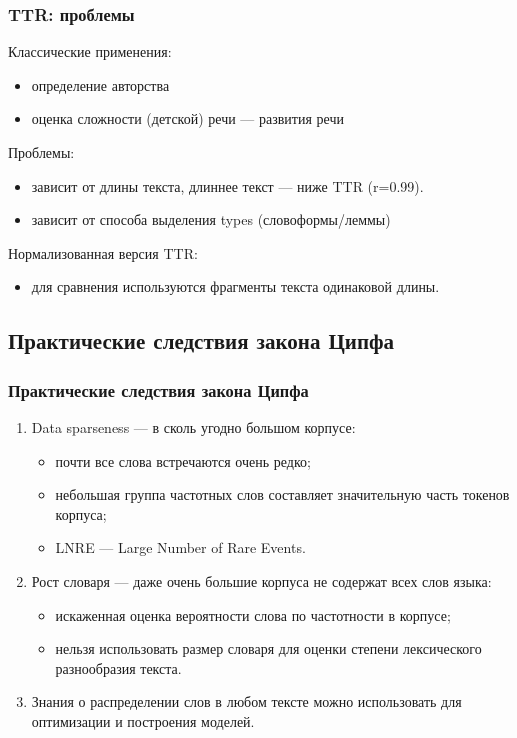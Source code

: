 \documentclass[svgnames]{beamer}
\begin{document}
\begin{frame}
  \frametitle{TTR: проблемы}
  Классические применения:
  \begin{itemize}
  \item определение авторства
  \item оценка сложности (детской) речи — развития речи
  \end{itemize}
  Проблемы:
  \begin{itemize}
  \item \alert{зависит от длины текста}, длиннее текст — ниже TTR (r=0.99).
  \item зависит от способа выделения types (словоформы/леммы)
  \end{itemize}
  Нормализованная версия TTR:
  \begin{itemize}
  \item для сравнения используются фрагменты текста одинаковой длины.
  \end{itemize}
\end{frame}

\subsection{Практические следствия закона Ципфа}

\begin{frame}
  \frametitle{Практические следствия закона Ципфа}
  \begin{enumerate}
  \item \alert{Data sparseness} — в сколь угодно большом корпусе:
    \begin{itemize}
    \item почти все слова встречаются очень редко;
    \item небольшая группа частотных слов составляет значительную
      часть токенов корпуса;
    \item LNRE — Large Number of Rare Events. 
    \end{itemize}
  \item \alert{Рост словаря} — даже очень большие корпуса не содержат всех слов языка:
    \begin{itemize}
    \item искаженная оценка вероятности слова по частотности в корпусе;
    \item нельзя использовать размер словаря для оценки степени
      лексического разнообразия текста.
    \end{itemize}
  \item \alert{Знания о распределении} слов в любом тексте можно использовать
    для оптимизации и построения моделей.
  \end{enumerate}
\end{frame}
\end{document}
